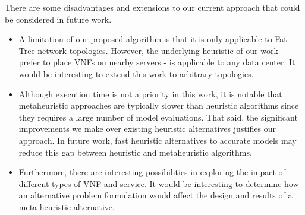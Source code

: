 There are some disadvantages and extensions to our current approach that could be considered in future work.
\begin{itemize}
    \item A limitation of our proposed algorithm is that it is only applicable to Fat Tree network topologies. However, the underlying heuristic of our work - prefer to place VNFs on nearby servers - is applicable to any data center. It would be interesting to extend this work to arbitrary topologies.
    \item Although execution time is not a priority in this work, it is notable that metaheuristic approaches are typically slower than heuristic algorithms since they requires a large number of model evaluations. That said, the significant improvements we make over existing heuristic alternatives justifies our approach. In future work, fast heuristic alternatives to accurate models may reduce this gap between heuristic and metaheuristic algorithms.
    \item Furthermore, there are interesting possibilities in exploring the impact of different types of VNF and service. It would be interesting to determine how an alternative problem formulation would affect the design and results of a meta-heuristic alternative.
\end{itemize}